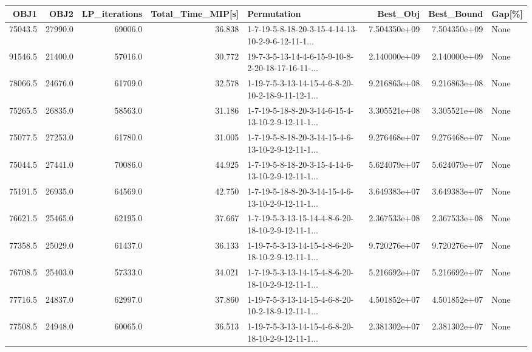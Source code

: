 \begin{tabular}{rrrrlrrl}
\toprule
    OBJ1 &     OBJ2 &  LP\_iterations &  Total\_Time\_MIP[s] &                                        Permutation &      Best\_Obj &    Best\_Bound & Gap[\%] \\
\midrule
 75043.5 &  27990.0 &        69006.0 &             36.838 &  1-7-19-5-8-18-20-3-15-4-14-13-10-2-9-6-12-11-1... &  7.504350e+09 &  7.504350e+09 &   None \\
 91546.5 &  21400.0 &        57016.0 &             30.772 &  19-7-3-5-13-14-4-6-15-9-10-8-2-20-18-17-16-11-... &  2.140000e+09 &  2.140000e+09 &   None \\
 78066.5 &  24676.0 &        61709.0 &             32.578 &  1-19-7-5-3-13-14-15-4-6-8-20-10-2-18-9-11-12-1... &  9.216863e+08 &  9.216863e+08 &   None \\
 75265.5 &  26835.0 &        58563.0 &             31.186 &  1-7-19-5-18-8-20-3-14-6-15-4-13-10-2-9-12-11-1... &  3.305521e+08 &  3.305521e+08 &   None \\
 75077.5 &  27253.0 &        61780.0 &             31.005 &  1-7-19-5-8-18-20-3-14-15-4-6-13-10-2-9-12-11-1... &  9.276468e+07 &  9.276468e+07 &   None \\
 75044.5 &  27441.0 &        70086.0 &             44.925 &  1-7-19-5-8-18-20-3-15-4-14-6-13-10-2-9-12-11-1... &  5.624079e+07 &  5.624079e+07 &   None \\
 75191.5 &  26935.0 &        64569.0 &             42.750 &  1-7-19-5-18-8-20-3-14-15-4-6-13-10-2-9-12-11-1... &  3.649383e+07 &  3.649383e+07 &   None \\
 76621.5 &  25465.0 &        62195.0 &             37.667 &  1-7-19-5-3-13-15-14-4-8-6-20-18-10-2-9-12-11-1... &  2.367533e+08 &  2.367533e+08 &   None \\
 77358.5 &  25029.0 &        61437.0 &             36.133 &  1-19-7-5-3-13-14-15-4-8-6-20-18-10-2-9-12-11-1... &  9.720276e+07 &  9.720276e+07 &   None \\
 76708.5 &  25403.0 &        57333.0 &             34.021 &  1-7-19-5-3-13-14-15-4-8-6-20-18-10-2-9-12-11-1... &  5.216692e+07 &  5.216692e+07 &   None \\
 77716.5 &  24837.0 &        62997.0 &             37.860 &  1-19-7-5-3-13-14-15-4-6-8-20-10-2-18-9-12-11-1... &  4.501852e+07 &  4.501852e+07 &   None \\
 77508.5 &  24948.0 &        60065.0 &             36.513 &  1-19-7-5-3-13-14-15-4-6-8-20-18-10-2-9-12-11-1... &  2.381302e+07 &  2.381302e+07 &   None \\

\end{tabular}
